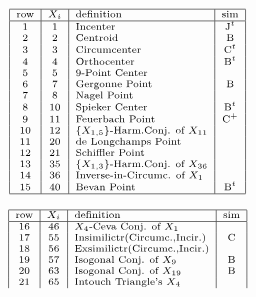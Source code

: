 \begin{table}
\begin{minipage}[t]{.475\linewidth}
$$
\scriptsize
\begin{array}{|c|c|l|c|}
\hline
\text{row} & X_i & \text{definition} & \text{sim} \\
\hline
 1 & {1} & \text{Incenter} & \text{J}^t \\
 2 & {2} & \text{Centroid} & \text{B} \\
 3 & {3} & \text{Circumcenter} & \text{C}^t  \\
 4 & {4} & \text{Orthocenter} & \text{B}^t \\
 5 & {5} & \text{9-Point Center} &  \\
 6 & {7} & \text{Gergonne Point} & \text{B}\\
 7 & {8} & \text{Nagel Point} &  \\
 8 & {10} & \text{Spieker Center} & \text{B}^t\\
 9 & {11} & \text{Feuerbach Point} & \text{C}^+ \\
 10 & {12} & \text{$\{X_{1,5}\}$-Harm.Conj. of $X_{11}$} & \\
 11 & {20} & \text{de Longchamps Point} & \\
 12 & {21} & \text{Schiffler Point} & \\
 13 & {35} & \text{$\{X_{1,3}\}$-Harm.Conj. of $X_{36}$} & \\
 14 & {36} & \text{Inverse-in-Circumc. of $X_1$} & \\
 15 & {40} & \text{Bevan Point} & \text{B}^t \\
 \hline
\end{array}
$$
\end{minipage}%
\begin{minipage}[t]{.475\linewidth}
$$
\scriptsize
\begin{array}{|c|c|l|c|}
\hline
\text{row} & X_i & \text{definition} & \text{sim} \\
\hline
16 & {46} & \text{$X_4$-Ceva Conj. of $X_1$} & \\
 17 & {55} & \text{Insimilictr(Circumc.,Incir.)} & \text{C}\\
 18 & {56} & \text{Exsimilictr(Circumc.,Incir.)} &  \\
 19 & {57} & \text{Isogonal Conj. of $X_9$} & \text{B} \\
 20 & {63} & \text{Isogonal Conj. of $X_{19}$} & \text{B} \\
 21 & {65} & \text{Intouch Triangle's $X_4$} & \\

\end{array}$$
\end{minipage}
\end{table}
